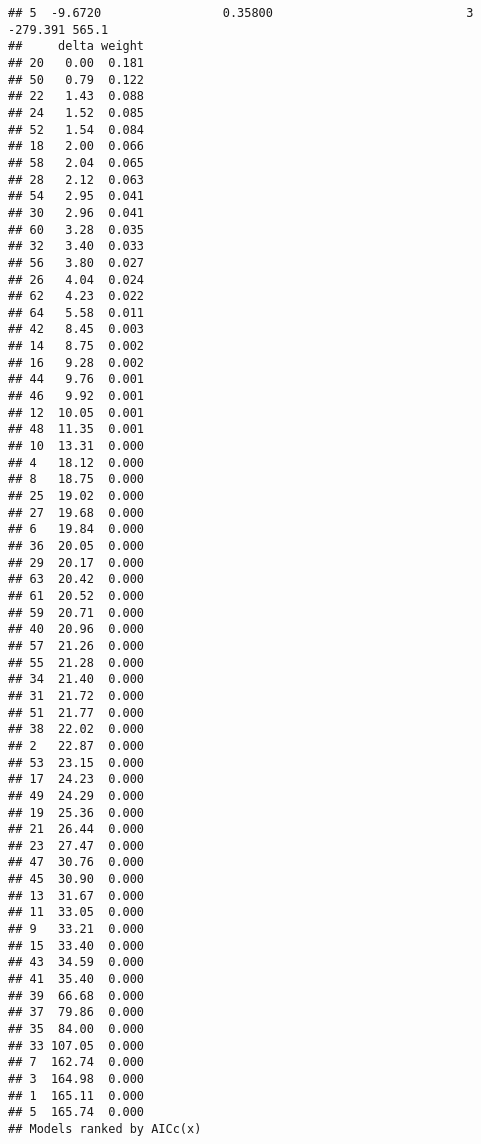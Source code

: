 \documentclass[]{article}
\begin{document}
\begin{verbatim}
## 5  -9.6720                 0.35800                           3 -279.391 565.1
##     delta weight
## 20   0.00  0.181
## 50   0.79  0.122
## 22   1.43  0.088
## 24   1.52  0.085
## 52   1.54  0.084
## 18   2.00  0.066
## 58   2.04  0.065
## 28   2.12  0.063
## 54   2.95  0.041
## 30   2.96  0.041
## 60   3.28  0.035
## 32   3.40  0.033
## 56   3.80  0.027
## 26   4.04  0.024
## 62   4.23  0.022
## 64   5.58  0.011
## 42   8.45  0.003
## 14   8.75  0.002
## 16   9.28  0.002
## 44   9.76  0.001
## 46   9.92  0.001
## 12  10.05  0.001
## 48  11.35  0.001
## 10  13.31  0.000
## 4   18.12  0.000
## 8   18.75  0.000
## 25  19.02  0.000
## 27  19.68  0.000
## 6   19.84  0.000
## 36  20.05  0.000
## 29  20.17  0.000
## 63  20.42  0.000
## 61  20.52  0.000
## 59  20.71  0.000
## 40  20.96  0.000
## 57  21.26  0.000
## 55  21.28  0.000
## 34  21.40  0.000
## 31  21.72  0.000
## 51  21.77  0.000
## 38  22.02  0.000
## 2   22.87  0.000
## 53  23.15  0.000
## 17  24.23  0.000
## 49  24.29  0.000
## 19  25.36  0.000
## 21  26.44  0.000
## 23  27.47  0.000
## 47  30.76  0.000
## 45  30.90  0.000
## 13  31.67  0.000
## 11  33.05  0.000
## 9   33.21  0.000
## 15  33.40  0.000
## 43  34.59  0.000
## 41  35.40  0.000
## 39  66.68  0.000
## 37  79.86  0.000
## 35  84.00  0.000
## 33 107.05  0.000
## 7  162.74  0.000
## 3  164.98  0.000
## 1  165.11  0.000
## 5  165.74  0.000
## Models ranked by AICc(x)
\end{verbatim}
\end{document}
